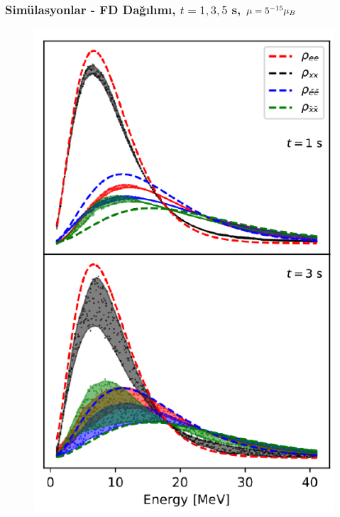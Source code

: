 \documentclass[10pt]{beamer}
\begin{document}
\begin{frame}
    \frametitle{Simülasyonlar - FD Dağılımı, $t=1,3,5$ s, $\mu=5\time10^{-15}\mu_{B}$}
    \begin{minipage}{0.45\textwidth}
        \begin{figure}[hbt!]
            \centering
            \includegraphics[width=\textwidth]{fig/9_1.pdf}
        \end{figure}
    \end{minipage}
    \hfill
    \begin{minipage}{0.45\textwidth}
        \begin{figure}[hbt!]
            \centering

\end{figure}
\end{minipage}
\end{frame}
\end{document}
